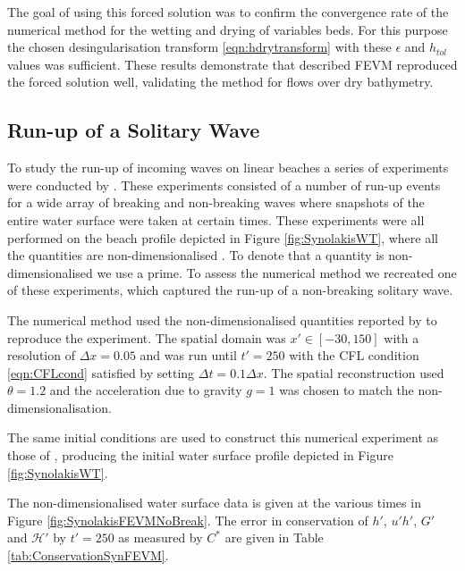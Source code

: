 \documentclass[times]{elsarticle}
\begin{document}
The goal of using this forced solution was to confirm the convergence rate of the numerical method for the wetting and drying of variables beds. For this purpose the chosen desingularisation transform \eqref{eqn:hdrytransform} with these $\epsilon$ and $h_{{tol}}$ values was sufficient. These results demonstrate that described FEVM reproduced the forced solution well, validating the method for flows over dry bathymetry.

\subsection{Run-up of a Solitary Wave}

To study the run-up of incoming waves on linear beaches a series of experiments were conducted by \citet{Synolakis-1987-523}. These experiments consisted of a number of run-up events for a wide array of breaking and non-breaking waves where snapshots of the entire water surface were taken at certain times. These experiments were all performed on the beach profile depicted in Figure \ref{fig:SynolakisWT}, where all the quantities are non-dimensionalised \cite{Synolakis-1987-523}. To denote that a quantity is non-dimensionalised we use a prime. To assess the numerical method we recreated one of these experiments, which captured the run-up of a non-breaking solitary wave.

The numerical method used the non-dimensionalised quantities reported by \citet{Synolakis-1987-523} to reproduce the experiment. The spatial domain was $x' \in [-30,150]$ with a resolution of $\Delta x = 0.05$ and was run until $t' = 250$ with the CFL condition \eqref{eqn:CFLcond} satisfied by setting $\Delta t = 0.1 \Delta x$. The spatial reconstruction used $\theta = 1.2$ and the acceleration due to gravity $g= 1$ was chosen to match the non-dimensionalisation.

The same initial conditions are used to construct this numerical experiment as those of \citet{Li-2014-169}, producing the initial water surface profile depicted in Figure \ref{fig:SynolakisWT}.

The non-dimensionalised water surface data is given at the various times in Figure \ref{fig:SynolakisFEVMNoBreak}. The error in conservation of $h'$, $u'h'$, $G'$ and $\mathcal{H}'$ by $t' = 250$ as measured by $C^*$ are given in Table \ref{tab:ConservationSynFEVM}.
\end{document}

